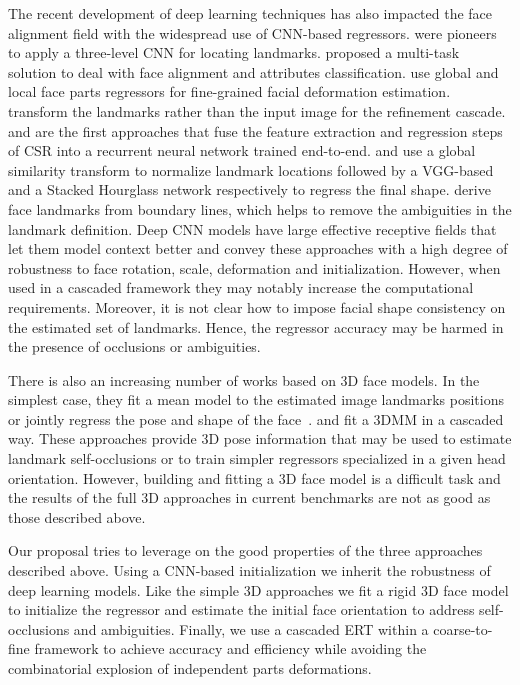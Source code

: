 \documentclass[11pt,twocolumn]{article}
\begin{document}
The recent development of deep learning techniques has also impacted the face alignment field with the widespread use of CNN-based regressors. \cite{Sun13} were pioneers to apply a three-level CNN for locating landmarks. \cite{Zhang14b} proposed a multi-task solution to deal with face alignment and attributes classification. \cite{Lv17} use global and local face parts regressors for fine-grained facial deformation estimation. \cite{Yu16} transform the landmarks rather than the input image for the refinement cascade. \cite{Trigeorgis16} and \cite{Xiao16} are the first approaches that fuse the feature extraction and regression steps of CSR into a recurrent neural network trained end-to-end. \cite{Kowalski17} and \cite{Yang17} use a global similarity transform to normalize landmark locations followed by a VGG-based and a Stacked Hourglass network respectively to regress the final shape. \cite{Wu18} derive face landmarks from boundary lines, which helps to remove the ambiguities in the landmark definition. Deep CNN models have large effective receptive fields that let them model context better and convey these approaches with a high degree of robustness to face rotation, scale, deformation and initialization. However, when used in a cascaded framework they may notably increase the computational requirements. Moreover, it is not clear how to impose facial shape consistency on the estimated set of landmarks. Hence, the regressor accuracy may be harmed in the presence of occlusions or ambiguities.

There is also an increasing number of works based on 3D face models. In the simplest case, they fit a mean model to the estimated image landmarks positions~\citep{Kowalski16} or jointly regress the pose and shape of the face~\citep{Jourabloo17,Xiao17}. \cite{Zhu17} and \cite{Kumar18a} fit a 3DMM in a cascaded way. These approaches provide 3D pose information that may be used to estimate landmark self-occlusions or to train simpler regressors specialized in a given head orientation. However, building and fitting a 3D face model is a difficult task and the results of the full 3D approaches in current benchmarks are not as good as those described above. 

Our proposal tries to leverage on the good properties of the three approaches described above. Using a CNN-based initialization we inherit the robustness of deep learning models. Like the simple 3D approaches we fit a rigid 3D face model to initialize the regressor and estimate the initial face orientation to address self-occlusions and ambiguities. Finally, we use a cascaded ERT within a coarse-to-fine framework to achieve accuracy and efficiency while avoiding the combinatorial explosion of independent parts deformations.
\end{document}

